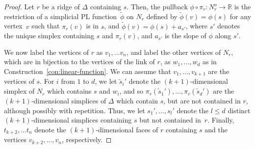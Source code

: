 \documentclass[11pt,reqno]{amsart}
\theoremstyle{definition}
\newcommand{\RR}{\mathbb R}
\begin{document}
\begin{proof}
Let $r$ be a ridge of $\Delta$ containing $s$. Then, the pullback $\phi \circ
\pi_r \colon N_r^o \rightarrow \RR$ is the restriction of a simplicial PL
function~$\tilde \phi$ on $N_r$ defined by $\tilde\phi(v) = \phi(s)$ for any
vertex~$v$ such that $\pi_r(v)$ is in $s$, and $\tilde\phi(v) =
\phi(s) + a_{s'}$, where $s'$ denotes the unique simplex containing $s$ and
$\pi_r(v)$, and $a_{s'}$ is the slope of $\phi$ along $s'$.

We now label the vertices of $r$ as $v_1, \ldots v_n$, and label the other
vertices of $N_r$, which are in bijection to the vertices of the link of $r$, as
$w_1, \ldots, w_d$ as in Construction~\ref{con:linear-function}. We can assume
that $v_1, \ldots, v_{k+1}$ are the vertices of $s$. For $i$ from
$1$ to $d$, we let $\tilde s_i'$ denote the $(k+1)$-dimensional simplex of $N_r$
which contains $s$ and $w_i$, and so $\pi_r(\tilde s_1'), \ldots, \pi_r(\tilde
s_d')$ are the $(k+1)$-dimensional simplices of $\Delta$ which contain $s$, but
are not contained in $r$, although possibly with repetition. Thus, we let $s_1',
\ldots, s_l'$
denote the $l \leq d$ distinct $(k+1)$-dimensional simplices containing $s$ but
not contained
in~$r$. Finally, $t_{k+2}, \ldots t_{n}$ denote the $(k+1)$-dimensional
faces of $r$ containing $s$ and the vertices $v_{k+2}, \ldots, v_{n}$,
respectively.


\end{proof}
\end{document}
